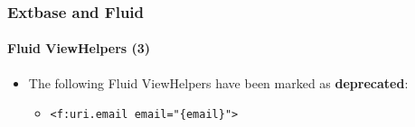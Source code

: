 %

\begin{frame}[fragile]
	\frametitle{Extbase and Fluid}
	\framesubtitle{Fluid ViewHelpers (3)}


	\begin{itemize}
		\item The following Fluid ViewHelpers have been marked as \textbf{deprecated}:

			\begin{itemize}\small
				\item \texttt{<f:uri.email email="\{email\}">}
			\end{itemize}\normalsize

	\end{itemize}

\end{frame}

